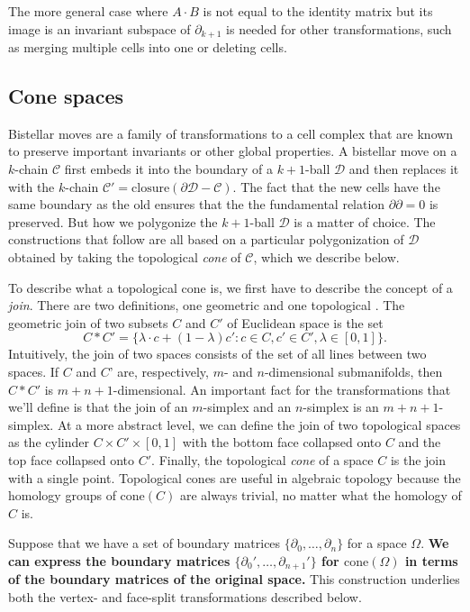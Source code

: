 \documentclass[twocolumn]{article}
\begin{document}
The more general case where $A\cdot B$ is not equal to the identity matrix but its image is an invariant subspace of $\partial_{k + 1}$ is needed for other transformations, such as merging multiple cells into one or deleting cells.

\subsection{Cone spaces}

Bistellar moves are a family of transformations to a cell complex that are known to preserve important invariants or other global properties.
A bistellar move on a $k$-chain $\mathscr{C}$ first embeds it into the boundary of a $k + 1$-ball $\mathscr{D}$ and then replaces it with the $k$-chain $\mathscr C' = \text{closure}(\partial\mathscr D - \mathscr C)$.
The fact that the new cells have the same boundary as the old ensures that the the fundamental relation $\partial\partial = 0$ is preserved.
But how we polygonize the $k + 1$-ball $\mathscr{D}$ is a matter of choice.
The constructions that follow are all based on a particular polygonization of $\mathscr{D}$ obtained by taking the topological \emph{cone} of $\mathscr{C}$, which we describe below.

To describe what a topological cone is, we first have to describe the concept of a \emph{join}.
There are two definitions, one geometric and one topological \cite{hatcher2002algebraic}.
The geometric join of two subsets $C$ and $C'$ of Euclidean space is the set
\begin{equation}
    C * C' = \{\lambda\cdot c + (1 - \lambda)c' : c \in C, c' \in C', \lambda \in [0, 1]\}.
\end{equation}
Intuitively, the join of two spaces consists of the set of all lines between two spaces.
If $C$ and $C$' are, respectively, $m$- and $n$-dimensional submanifolds, then $C * C'$ is $m + n + 1$-dimensional.
An important fact for the transformations that we'll define is that the join of an $m$-simplex and an $n$-simplex is an $m + n + 1$-simplex.
At a more abstract level, we can define the join of two topological spaces as the cylinder $C \times C' \times [0, 1]$ with the bottom face collapsed onto $C$ and the top face collapsed onto $C'$.
Finally, the topological \emph{cone} of a space $C$ is the join with a single point.
Topological cones are useful in algebraic topology because the homology groups of $\text{cone}(C)$ are always trivial, no matter what the homology of $C$ is.

Suppose that we have a set of boundary matrices $\{\partial_0, \ldots, \partial_n\}$ for a space $\Omega$.
\textbf{We can express the boundary matrices $\{\partial_0', \ldots, \partial_{n + 1}'\}$ for $\text{cone}(\Omega)$ in terms of the boundary matrices of the original space.}
This construction underlies both the vertex- and face-split transformations described below.
\end{document}
